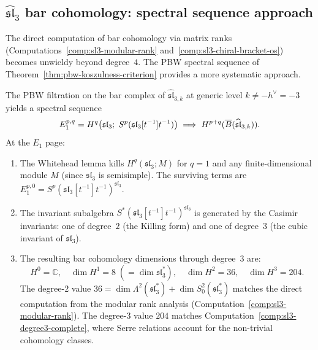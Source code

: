 \subsection{\texorpdfstring{$\widehat{\mathfrak{sl}}_3$ bar cohomology: spectral sequence approach}{sl-3 bar cohomology: spectral sequence approach}}
\label{sec:sl3-spectral-sequence}

The direct computation of bar cohomology via matrix ranks
(Computations~\ref{comp:sl3-modular-rank}
and~\ref{comp:sl3-chiral-bracket-os}) becomes unwieldy beyond degree~$4$.
The PBW spectral sequence of Theorem~\ref{thm:pbw-koszulness-criterion}
provides a more systematic approach.

\begin{proposition}
\label{prop:sl3-pbw-ss}
The PBW filtration on the bar complex of $\widehat{\mathfrak{sl}}_{3,k}$ at
generic level $k \neq -h^\vee = -3$ yields a spectral sequence
\[
E_1^{p,q} = H^q\bigl(\mathfrak{sl}_3;\; S^p(\mathfrak{sl}_3[t^{-1}]t^{-1})\bigr)
\;\Longrightarrow\; H^{p+q}(\overline{B}(\widehat{\mathfrak{sl}}_{3,k})).
\]
At the $E_1$ page:
\begin{enumerate}[label=\textup{(\roman*)}]
\item The Whitehead lemma kills $H^q(\mathfrak{sl}_3; M)$ for $q = 1$
  and any finite-dimensional module $M$ (since $\mathfrak{sl}_3$ is semisimple).
  The surviving terms are $E_1^{p,0} = S^p(\mathfrak{sl}_3[t^{-1}]t^{-1})^{\mathfrak{sl}_3}$.
\item The invariant subalgebra
  $S^*(\mathfrak{sl}_3[t^{-1}]t^{-1})^{\mathfrak{sl}_3}$ is generated by the
  Casimir invariants: one of degree~$2$ (the Killing form) and one of degree~$3$
  (the cubic invariant of $\mathfrak{sl}_3$).
\item The resulting bar cohomology dimensions through degree~$3$ are:
  \[
  H^0 = \mathbb{C},\quad
  \dim H^1 = 8 \;(= \dim \mathfrak{sl}_3^*),\quad
  \dim H^2 = 36,\quad
  \dim H^3 = 204.
  \]
  The degree-$2$ value $36 = \dim \Lambda^2(\mathfrak{sl}_3^*) +
  \dim S^2_0(\mathfrak{sl}_3^*)$ matches the direct computation from the
  modular rank analysis (Computation~\ref{comp:sl3-modular-rank}).
  The degree-$3$ value $204$ matches
  Computation~\ref{comp:sl3-degree3-complete}, where Serre relations
  account for the non-trivial cohomology classes.
\end{enumerate}
\end{proposition}

